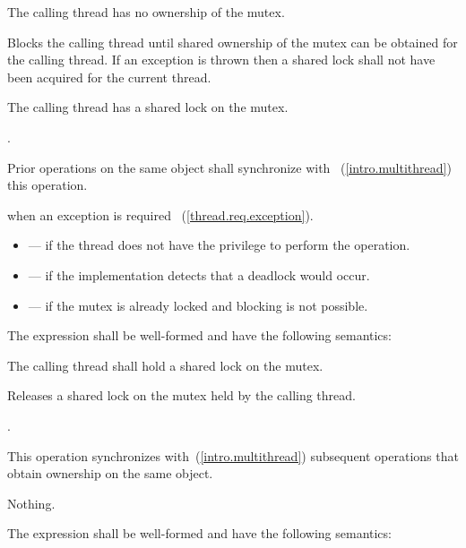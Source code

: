 \begin{itemdescr}
\pnum
\requires The calling thread has no ownership of the mutex.

\pnum
\effects Blocks the calling thread until shared ownership of the mutex can be obtained for the calling thread.
If an exception is thrown then a shared lock shall not have been acquired for the current thread.

\pnum
\postcondition The calling thread has a shared lock on the mutex.

\pnum
\returntype {}.

\pnum
\sync Prior  operations on the same object shall synchronize with ~(\ref{intro.multithread}) this operation.

\pnum
\throws {} when an exception is required ~(\ref{thread.req.exception}).

\pnum
\errors
\begin{itemize}
\item {} --- if the thread does not have the privilege to perform the operation.
\item {} --- if the implementation detects that a deadlock would occur.
\item {} --- if the mutex is already locked and blocking is not possible.
\end{itemize}
\end{itemdescr}

\pnum
The expression  shall be well-formed and have the following semantics:

\begin{itemdescr}
\pnum
\requires The calling thread shall hold a shared lock on the mutex.

\pnum
\effects Releases a shared lock on the mutex held by the calling thread.

\pnum
\returntype {}.

\pnum
\sync This operation synchronizes with~(\ref{intro.multithread}) subsequent
 operations that obtain ownership on the same object.

\pnum
\throws Nothing.
\end{itemdescr}

\pnum
The expression  shall be well-formed and have the following semantics:

